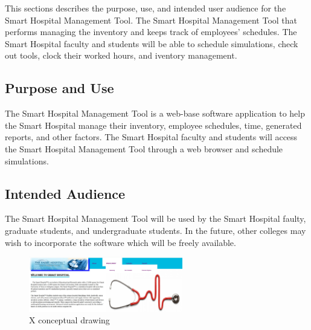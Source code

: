 This sections describes the purpose, use, and intended user audience for the Smart Hospital Management Tool. The Smart Hospital Management Tool that performs managing the inventory and keeps track of employees' schedules. The Smart Hospital faculty and students will be able to schedule simulations, check out tools, clock their worked hours, and iventory management.

\subsection{Purpose and Use}
The Smart Hospital Management Tool is a web-base software application to help the Smart Hospital manage their inventory, employee schedules, time, generated reports, and other factors. The Smart Hospital faculty and students will access the Smart Hospital Management Tool through a web browser and schedule simulations.

\subsection{Intended Audience}
The Smart Hospital Management Tool will be used by the Smart Hospital faulty, graduate students, and undergraduate students. In the future, other colleges may wish to incorporate the software which will be freely available.

\begin{figure}[h!]
	\centering
   	\includegraphics[width=0.60\textwidth]{images/concept_screenshot_1}
    \caption{X conceptual drawing}
\end{figure}
